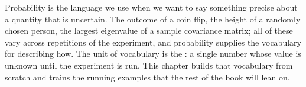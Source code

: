 %
%
%
%
%
%
%

Probability is the language we use when we want to say something precise about a quantity that is uncertain. The outcome of a coin flip, the height of a randomly chosen person, the largest eigenvalue of a sample covariance matrix; all of these vary across repetitions of the experiment, and probability supplies the vocabulary for describing how. The unit of vocabulary is the : a single number whose value is unknown until the experiment is run. This chapter builds that vocabulary from scratch and trains the running examples that the rest of the book will lean on.

